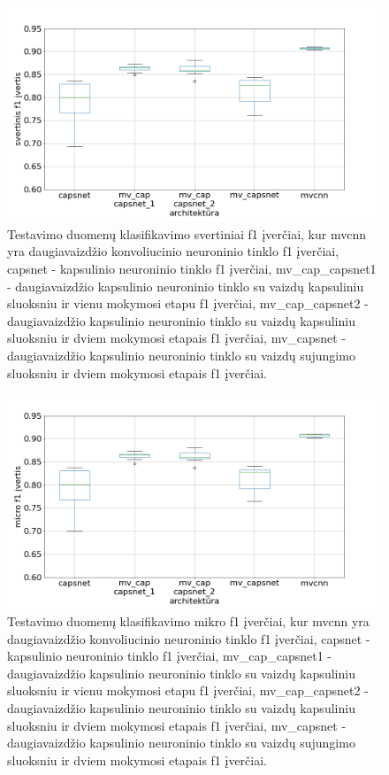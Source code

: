\begin{figure}[h]
	\centering
	\includegraphics[scale=0.5]{img/boxplot_f1_weighted.png}
	\caption{
		Testavimo duomenų klasifikavimo svertiniai f1 įverčiai, kur mvcnn yra daugiavaizdžio konvoliucinio neuroninio tinklo f1 įverčiai, capsnet - kapsulinio neuroninio tinklo f1 įverčiai, mv\_cap\_capsnet1 - daugiavaizdžio kapsulinio neuroninio tinklo su vaizdų kapsuliniu sluoksniu ir vienu mokymosi etapu f1 įverčiai, mv\_cap\_capsnet2 - daugiavaizdžio kapsulinio neuroninio tinklo su vaizdų kapsuliniu sluoksniu ir dviem mokymosi etapais f1 įverčiai,
		mv\_capsnet - daugiavaizdžio kapsulinio neuroninio tinklo su vaizdų sujungimo sluoksniu ir dviem mokymosi etapais f1 įverčiai.
	}
	\label{img:box_weighted_f1}
\end{figure}

\begin{figure}[H]
	\centering
	\includegraphics[scale=0.5]{img/boxplot_f1_micro.png}
	\caption{
		Testavimo duomenų klasifikavimo mikro f1 įverčiai, kur mvcnn yra daugiavaizdžio konvoliucinio neuroninio tinklo f1 įverčiai, capsnet - kapsulinio neuroninio tinklo f1 įverčiai, mv\_cap\_capsnet1 - daugiavaizdžio kapsulinio neuroninio tinklo su vaizdų kapsuliniu sluoksniu ir vienu mokymosi etapu f1 įverčiai, mv\_cap\_capsnet2 - daugiavaizdžio kapsulinio neuroninio tinklo su vaizdų kapsuliniu sluoksniu ir dviem mokymosi etapais f1 įverčiai,
		mv\_capsnet - daugiavaizdžio kapsulinio neuroninio tinklo su vaizdų sujungimo sluoksniu ir dviem mokymosi etapais f1 įverčiai.
	}
	\label{img:box_micro_f1}
\end{figure}

